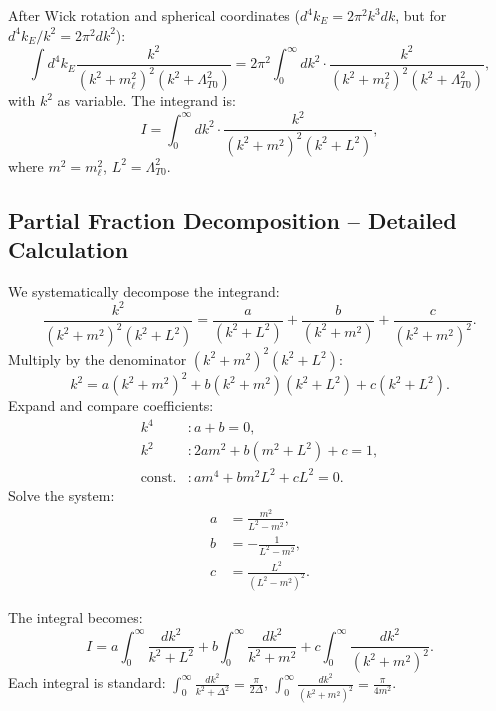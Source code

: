 \documentclass[12pt,a4paper]{article}
\begin{document}
	After Wick rotation and spherical coordinates ($d^4k_E = 2\pi^2 k^3 dk$, but for $d^4k_E / k^2 = 2\pi^2 dk^2$):
	\begin{equation}
		\int d^4k_E \frac{k^2}{(k^2 + m_\ell^2)^2 (k^2 + \Lambda_{T0}^2)} = 2\pi^2 \int_0^\infty dk^2 \cdot \frac{k^2}{(k^2 + m_\ell^2)^2 (k^2 + \Lambda_{T0}^2)},
	\end{equation}
	with $k^2$ as variable. The integrand is:
	\begin{equation}
		I = \int_0^\infty dk^2 \cdot \frac{k^2}{(k^2 + m^2)^2 (k^2 + L^2)},
	\end{equation}
	where $m^2 = m_\ell^2$, $L^2 = \Lambda_{T0}^2$.
	
	\subsection{Partial Fraction Decomposition -- Detailed Calculation}
	We systematically decompose the integrand:
	\begin{equation}
		\frac{k^2}{(k^2 + m^2)^2 (k^2 + L^2)} = \frac{a}{(k^2 + L^2)} + \frac{b}{(k^2 + m^2)} + \frac{c}{(k^2 + m^2)^2}.
	\end{equation}
	Multiply by the denominator $(k^2 + m^2)^2 (k^2 + L^2)$:
	\begin{equation}
		k^2 = a (k^2 + m^2)^2 + b (k^2 + m^2) (k^2 + L^2) + c (k^2 + L^2).
	\end{equation}
	Expand and compare coefficients:
	\begin{align}
		k^4 &: a + b = 0, \\
		k^2 &: 2 a m^2 + b (m^2 + L^2) + c = 1, \\
		\text{const.} &: a m^4 + b m^2 L^2 + c L^2 = 0.
	\end{align}
	Solve the system:
	\begin{align}
		a &= \frac{m^2}{L^2 - m^2}, \\
		b &= -\frac{1}{L^2 - m^2}, \\
		c &= \frac{L^2}{(L^2 - m^2)^2}.
	\end{align}
	
	The integral becomes:
	\begin{equation}
		I = a \int_0^\infty \frac{dk^2}{k^2 + L^2} + b \int_0^\infty \frac{dk^2}{k^2 + m^2} + c \int_0^\infty \frac{dk^2}{(k^2 + m^2)^2}.
	\end{equation}
	Each integral is standard: $\int_0^\infty \frac{dk^2}{k^2 + \Delta^2} = \frac{\pi}{2 \Delta}$, $\int_0^\infty \frac{dk^2}{(k^2 + m^2)^2} = \frac{\pi}{4 m^2}$.
	
\end{document}
